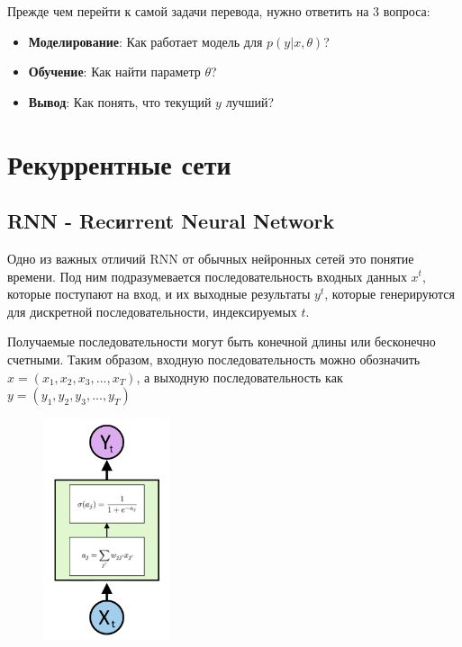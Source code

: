 \documentclass[a4paper,russian]{article}
\begin{document}
	Прежде чем перейти к самой задачи перевода, нужно ответить на 3 вопроса:
	
	\begin{itemize}
		\item \textbf{Моделирование}: Как работает модель для $p(y|x, \theta)$?
		\item \textbf{Обучение}: Как найти параметр $\theta$?
		\item \textbf{Вывод}: Как понять, что текущий $y$ лучший?
	\end{itemize}
	
	\clearpage
	
	\section{Рекуррентные сети}
	
	\subsection{RNN - Recиrrent Neural Network}
	
	Одно из важных отличий RNN от обычных нейронных сетей это понятие времени. Под ним подразумевается последовательность входных данных $x^t$, которые поступают на вход, и их выходные результаты $y^t$, которые генерируются для дискретной последовательности, индексируемых $t$. 
	
	Получаемые последовательности могут быть конечной длины или бесконечно счетными. Таким образом, входную последовательность можно обозначить $x = (x_1, x_2, x_3, ... , x_T)$, а выходную последовательность как $y = (y_1, y_2, y_3, ... , y_T)$
	
	\begin{figure}
		\centering
		\captionsetup{justification=centering}
		\includegraphics[height=65mm]{img/1.png}
	\end{figure}
	
\end{document}
